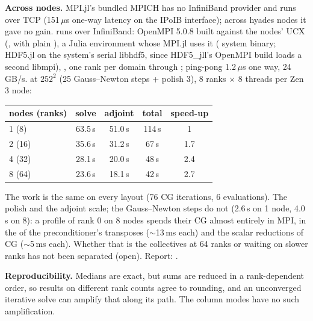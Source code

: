 \textbf{Across nodes.} MPI.jl's bundled MPICH has no InfiniBand provider and runs over TCP (151\,$\mu$s one-way latency on the
IPoIB interface); across hyades nodes it gave no gain.  runs over InfiniBand:
OpenMPI 5.0.8 built against the nodes' UCX (, with plain ), a Julia environment
whose MPI.jl uses it ( system binary; HDF5.jl on the system's serial libhdf5, since HDF5\_jll's OpenMPI build
loads a second libmpi), , one rank per domain through ; ping-pong 1.2\,$\mu$s one
way, 24\,GB/s.  at $252^2$ (25 Gauss--Newton steps + polish 3), 8 ranks $\times$ 8 threads per Zen\,3 node:
\begin{center}\small
\begin{tabular}{lcccc}
\toprule
nodes (ranks) & solve & adjoint & total & speed-up \\ \midrule
1 (8) & 63.5\,s & 51.0\,s & 114\,s & 1 \\
2 (16) & 35.6\,s & 31.2\,s & 67\,s & 1.7 \\
4 (32) & 28.1\,s & 20.0\,s & 48\,s & 2.4 \\
8 (64) & 23.6\,s & 18.1\,s & 42\,s & 2.7 \\
\bottomrule
\end{tabular}
\end{center}
The work is the same on every layout (76 CG iterations, 6 evaluations). The polish and the adjoint scale; the Gauss--Newton steps
do not (2.6\,s on 1 node, 4.0\,s on 8): a profile of rank 0 on 8 nodes spends their CG almost entirely in MPI, in the
 of the preconditioner's transposes ($\sim$13\,ms each) and the scalar reductions of CG ($\sim$5\,ms each). Whether
that is the collectives at 64 ranks or waiting on slower ranks has not been separated (open). Report:
.

\textbf{Reproducibility.} Medians are exact, but sums are reduced in a rank-dependent order, so results on different rank counts
agree to rounding, and an unconverged iterative solve can amplify that along its path. The column modes have no such
amplification.
